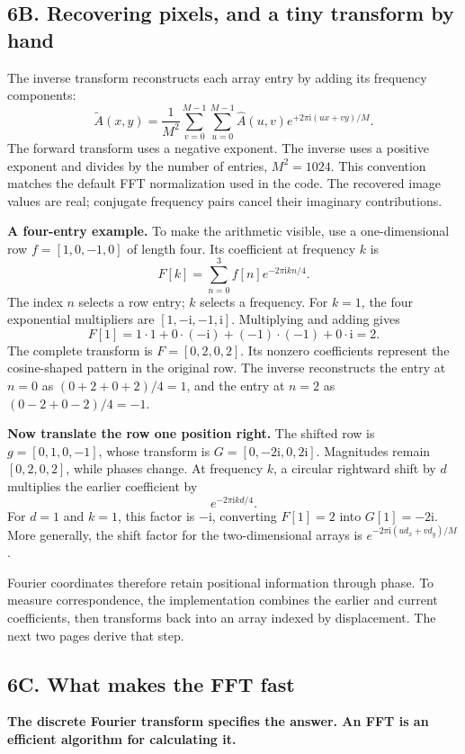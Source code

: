 \documentclass[11pt,letterpaper]{article}
\begin{document}
\clearpage
\subsection*{6B. Recovering pixels, and a tiny transform by hand}
The inverse transform reconstructs each array entry by adding its frequency components:
\begin{equation}
\widetilde A(x,y)=\frac{1}{M^2}\sum_{v=0}^{M-1}\sum_{u=0}^{M-1}
\widehat A(u,v)e^{+2\pi\mathrm{i}(ux+vy)/M}.
\end{equation}
The forward transform uses a negative exponent. The inverse uses a positive exponent and divides by the number of entries, $M^2=1024$. This convention matches the default FFT normalization used in the code. The recovered image values are real; conjugate frequency pairs cancel their imaginary contributions.

\textbf{A four-entry example.} To make the arithmetic visible, use a one-dimensional row $f=[1,0,-1,0]$ of length four. Its coefficient at frequency $k$ is
\[
F[k]=\sum_{n=0}^{3} f[n]e^{-2\pi\mathrm{i}kn/4}.
\]
The index $n$ selects a row entry; $k$ selects a frequency. For $k=1$, the four exponential multipliers are $[1,-\mathrm{i},-1,\mathrm{i}]$. Multiplying and adding gives
\[
F[1]=1\cdot1+0\cdot(-\mathrm{i})+(-1)\cdot(-1)+0\cdot\mathrm{i}=2.
\]
The complete transform is $F=[0,2,0,2]$. Its nonzero coefficients represent the cosine-shaped pattern in the original row. The inverse reconstructs the entry at $n=0$ as $(0+2+0+2)/4=1$, and the entry at $n=2$ as $(0-2+0-2)/4=-1$.

\textbf{Now translate the row one position right.} The shifted row is $g=[0,1,0,-1]$, whose transform is $G=[0,-2\mathrm{i},0,2\mathrm{i}]$. Magnitudes remain $[0,2,0,2]$, while phases change. At frequency $k$, a circular rightward shift by $d$ multiplies the earlier coefficient by
\[
e^{-2\pi\mathrm{i}kd/4}.
\]
For $d=1$ and $k=1$, this factor is $-\mathrm{i}$, converting $F[1]=2$ into $G[1]=-2\mathrm{i}$. More generally, the shift factor for the two-dimensional arrays is $e^{-2\pi\mathrm{i}(ud_x+vd_y)/M}$.

Fourier coordinates therefore retain positional information through phase. To measure correspondence, the implementation combines the earlier and current coefficients, then transforms back into an array indexed by displacement. The next two pages derive that step.

\clearpage
\subsection*{6C. What makes the FFT fast}
\textbf{The discrete Fourier transform specifies the answer. An FFT is an efficient algorithm for calculating it.}
\end{document}
